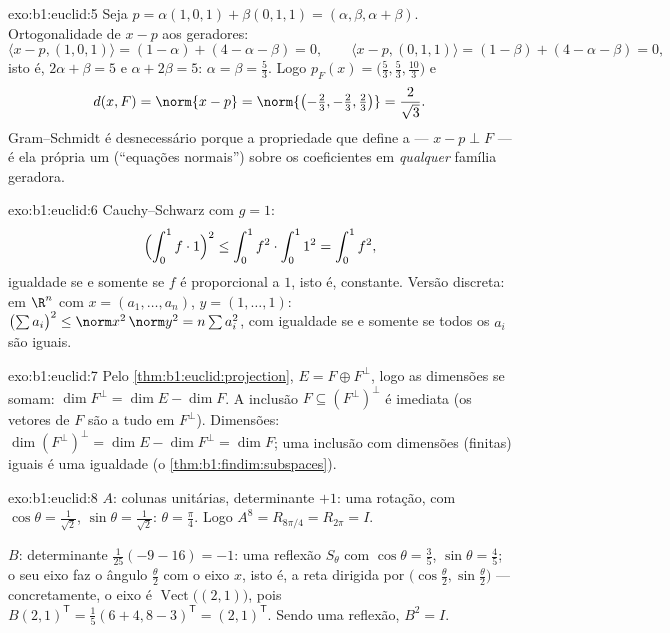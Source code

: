 \begin{solution}{exo:b1:euclid:5}
Seja $p = \alpha(1,0,1) + \beta(0,1,1) = (\alpha, \beta, \alpha +
\beta)$. Ortogonalidade de $x - p$ aos geradores:
\[
\langle x - p, (1,0,1)\rangle = (1 - \alpha) + (4 - \alpha - \beta)
= 0,
\qquad
\langle x - p, (0,1,1)\rangle = (1 - \beta) + (4 - \alpha - \beta)
= 0,
\]
isto é, $2\alpha + \beta = 5$ e $\alpha + 2\beta = 5$: $\alpha =
\beta = \frac53$. Logo $p_F(x) = \bigl(\frac53, \frac53,
\frac{10}{3}\bigr)$ e
\[
d(x, F) = \norm{x - p} =
\norm{\bigl(-\tfrac23, -\tfrac23, \tfrac23\bigr)} =
\frac{2}{\sqrt 3} .
\]
Gram--Schmidt é desnecessário porque a propriedade que define a
 --- $x - p \perp F$ --- é ela própria um  (``equações
normais'') sobre os coeficientes em \emph{qualquer} família
geradora.
\end{solution}

\begin{solution}{exo:b1:euclid:6}
Cauchy--Schwarz com $g = 1$:
\[
\Bigl(\int_0^1 f \cdot 1\Bigr)^2 \leq \int_0^1 f^2 \cdot \int_0^1
1^2 = \int_0^1 f^2 ,
\]
igualdade se e somente se $f$ é proporcional a $1$, isto é,
constante. Versão discreta: em $\R^n$ com $x = (a_1, \dots, a_n)$, $y = (1, \dots,
1)$: $\bigl(\sum a_i\bigr)^2 \leq \norm x^2\, \norm y^2 = n \sum a_i^2$, com
igualdade se e somente se todos os $a_i$ são iguais.
\end{solution}

\begin{solution}{exo:b1:euclid:7}
Pelo \cref{thm:b1:euclid:projection}, $E = F \oplus F^\perp$, logo as dimensões se somam: $\dim F^\perp = \dim E - \dim F$. A inclusão
$F
\subseteq (F^\perp)^\perp$ é imediata (os vetores de $F$ são  a tudo em
$F^\perp$). Dimensões: $\dim(F^\perp)^\perp = \dim E - \dim F^\perp = \dim F$; uma inclusão com dimensões (finitas)
iguais é uma igualdade (o \cref{thm:b1:findim:subspaces}).
\end{solution}

\begin{solution}{exo:b1:euclid:8}
$A$: colunas unitárias, determinante $+1$: uma rotação, com $\cos\theta =
\frac{1}{\sqrt2}$,
$\sin\theta = \frac{1}{\sqrt2}$: $\theta =
\frac\pi4$. Logo $A^8 = R_{8\pi/4} = R_{2\pi} = I$.

$B$: determinante $\frac{1}{25}(-9 - 16) = -1$: uma reflexão $S_\theta$ com $\cos\theta = \frac35$, $\sin\theta = \frac45$; o seu
eixo faz o ângulo $\frac\theta2$ com o eixo $x$, isto é, a reta dirigida por
$\bigl(\cos\frac\theta2, \sin\frac\theta2\bigr)$ --- concretamente, o eixo é $\operatorname{Vect}\bigl((2, 1)\bigr)$, pois $B(2,1)^{\mathsf T} =
\frac15(6+4, 8-3)^{\mathsf T} = (2,1)^{\mathsf T}$. Sendo uma
reflexão, $B^2 = I$.
\end{solution}

